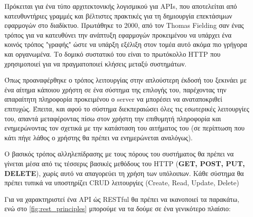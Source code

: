 Πρόκειται για ένα τύπο αρχιτεκτονικής λογισμικού για APIs, που αποτελείται από κατευθυντήριες γραμμές και βέλτιστες πρακτικές για τη δημιουργία επεκτάσιμων εφαρμογών στο διαδίκτυο.
Πρωτάθηκε το 2000, από τον Thomas Fielding \cite{rest_proposal} σαν ένας τρόπος για να κατευθύνει την ανάπτυξη εφαρμογών 
προκειμένου να υπάρχει ένα κοινός τρόπος "γραφής" ώστε να υπάρξη εξέλιξη στον τομέα αυτό ακόμα πιο γρήγορα και οργανωμένα.  
Το δομικό συστατικό του είναι το πρωτόκολλο HTTP που χρησιμοποιεί για να πραγματοποιεί κλήσεις μεταξύ συστημάτων.

Όπως προαναφέρθηκε ο τρόπος λειτουργίας στην απλούστερη έκδοσή του ξεκινάει με ένα αίτημα κάποιου χρήστη
σε ένα σύστημα της επιλογής του, παρέχοντας την απαραίτητη πληροφορία προκειμένου ο server να μπορέσει να αναταποκριθεί επιτυχώς.
Έπειτα, και αφού το σύστημα διεκπεραιώσει όλες τις εσωτερικές λειτουργίες του, απαντά μεταφέροντας πίσω στον χρήστη
την επιθυμητή πληροφορία και ενημερώνοντας τον σχετικά με την κατάσταση του αιτήματος του (σε περίπτωση που κάτι πήγε λάθος ο χρήστης
θα πρέπει να ενημερώνεται αναλόγως).

Ο βασικός τρόπος αλληλεπίδρασης με τους πόρους του συστήματος θα πρέπει να γίνεται
μέσα από τις τέσσερις βασικές μεθόδους του HTTP (\textbf{GET, POST, PUT, DELETE}), χωρίς αυτό να απαγορεύει
τη χρήση των υπόλοιπων. Κάθε σύστημα θα πρέπει τυπικά να υποστηρίζει CRUD λειτουργίες (Create, Read, Update, Delete)

Για να χαρακτηριστεί ένα API ώς RESTful θα πρέπει να ικανοποιεί τα παρακάτω, ενώ
στο \autoref{fig:rest_principles} μπορούμε να τα δούμε σε ένα γενικότερο πλαίσιο:

